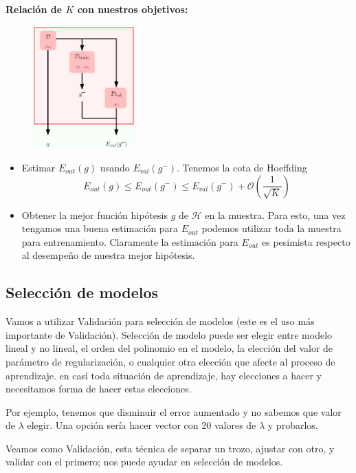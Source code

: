 \documentclass[11pt,a4paper]{article}
\theoremstyle{definition}
\begin{document}
	\textbf{Relación de $K$ con nuestros objetivos:}\\
	\begin{figure}[H]
		\centering
		\includegraphics[width=0.35\textwidth]{images/k_goals}
		\caption{}
	\end{figure}
	\begin{itemize}
		\item Estimar $E_{out}(g)$ usando $E_{val}(g^-)$. Tenemos la cota de Hoeffding
		$$E_{out}(g)\leq E_{out}(g^-)\leq E_{val}(g^-)+\mathcal{O}\left(\frac{1}{\sqrt{K}}\right)$$
		\item Obtener la mejor función hipótesis $g$ de $\mathcal{H}$ en la muestra. Para esto, una vez tengamos una buena estimación para $E_{out}$ podemos utilizar toda la muestra para entrenamiento. Claramente la estimación para $E_{out}$ es pesimista respecto al desempeño de nuestra mejor hipótesis.
	\end{itemize}
	\subsection{Selección de modelos}
	Vamos a utilizar Validación para selección de modelos (este es el uso más importante de Validación). Selección de modelo puede ser elegir entre modelo lineal y no lineal, el orden del polinomio en el modelo, la elección del valor de parámetro de regularización, o cualquier otra elección que afecte al proceso de aprendizaje. en casi toda situación de aprendizaje, hay elecciones a hacer y necesitamos forma de hacer estas elecciones.
	
	Por ejemplo, tenemos que disminuir el error aumentado y no sabemos que valor de $\lambda$ elegir. Una opción sería hacer vector con 20 valores de $\lambda$ y probarlos.
	
	Veamos como Validación, esta técnica de separar un trozo, ajustar con otro, y validar con el primero; nos puede ayudar en selección de modelos.\\
	
\end{document}
